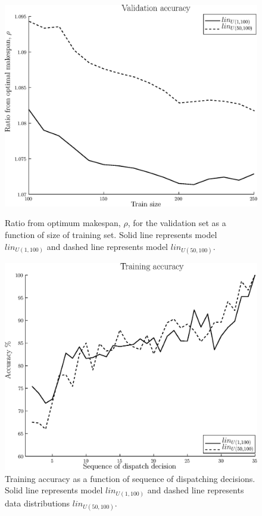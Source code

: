 \documentclass[10pt]{llncs}
\begin{document}
\begin{figure}[t!]
\centering
\includegraphics[width=.7\columnwidth]{figs/fig1_trainsize.eps}
\caption{Ratio from optimum makespan, $\rho$, for the validation set as a function of size of training set. Solid line represents model $lin_{U(1,100)}$ and dashed line represents model $lin_{U(50,100)}$.}\label{fig:train_size}
\includegraphics[width=.7\columnwidth]{figs/fig2_trainacc.eps}
\caption{Training accuracy as a function of sequence of dispatching decisions. Solid line represents model $lin_{U(1,100)}$ and dashed line represents data distributions $lin_{U(50,100)}$.}\label{fig:train_acc}
\end{figure}
\end{document}
